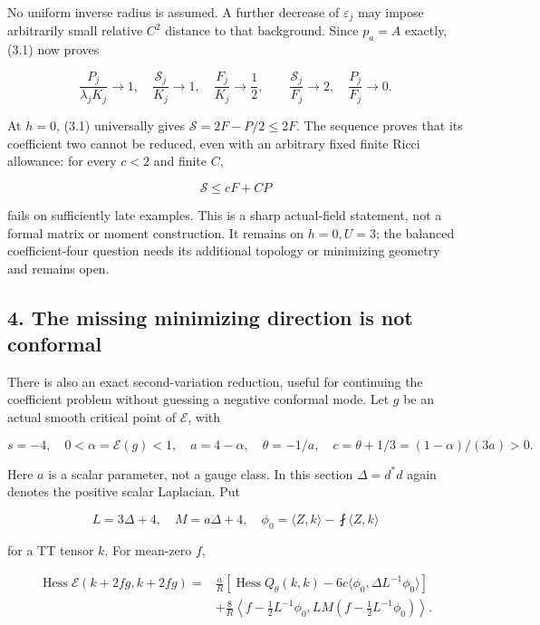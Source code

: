 \documentclass[
  10pt,
]{article}
\begin{document}
No uniform inverse radius is assumed. A further decrease of
\(\varepsilon_j\) may impose arbitrarily small relative \(C^2\) distance
to that background. Since \(p_a=A\) exactly, (3.1) now proves

\[
 \frac{P_j}{\lambda_jK_j}\to1,\quad
 \frac{\mathscr S_j}{K_j}\to1,\quad
 \frac{F_j}{K_j}\to\frac12,\qquad
 \boxed{\frac{\mathscr S_j}{F_j}\to2,\quad\frac{P_j}{F_j}\to0.} \tag{3.10}
\]

At \(h=0\), (3.1) universally gives \(\mathscr S=2F-P/2\le2F\). The
sequence proves that its coefficient two cannot be reduced, even with an
arbitrary fixed finite Ricci allowance: for every \(c<2\) and finite
\(C\),

\[
                         \mathscr S\le cF+CP                   \tag{3.11}
\]

fails on sufficiently late examples. This is a sharp actual-field
statement, not a formal matrix or moment construction. It remains on
\(h=0,U=3\); the balanced coefficient-four question needs its additional
topology or minimizing geometry and remains open.

\hypertarget{the-missing-minimizing-direction-is-not-conformal}{%
\subsection{4. The missing minimizing direction is not
conformal}\label{the-missing-minimizing-direction-is-not-conformal}}

There is also an exact second-variation reduction, useful for continuing
the coefficient problem without guessing a negative conformal mode. Let
\(g\) be an actual smooth critical point of \(\mathcal E\), with

\[
 s=-4,\quad0<\alpha=\mathcal E(g)<1,\quad
 a=4-\alpha,\quad\theta=-1/a,\quad
 c=\theta+1/3=(1-\alpha)/(3a)>0.
\]

Here \(a\) is a scalar parameter, not a gauge class. In this section
\(\Delta=d^*d\) again denotes the positive scalar Laplacian. Put

\[
 L=3\Delta+4,\quad M=a\Delta+4,
 \quad\phi_0=\langle Z,k\rangle-\fint\langle Z,k\rangle
\]

for a TT tensor \(k\). For mean-zero \(f\),

\[
\boxed{\begin{aligned}
 \operatorname{Hess}\mathcal E(k+2fg,k+2fg)
 ={}&\frac aR\left[\operatorname{Hess}Q_\theta(k,k)
                   -6c\langle\phi_0,\Delta L^{-1}\phi_0\rangle\right]\\
 &+\frac8R\left\langle f-\tfrac12L^{-1}\phi_0,
                  LM(f-\tfrac12L^{-1}\phi_0)\right\rangle.
\end{aligned}}                                                   \tag{4.1}
\]
\end{document}
